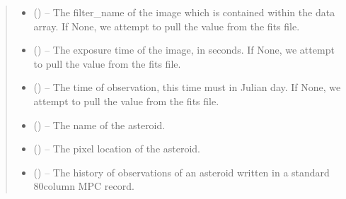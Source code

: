 \documentclass[letterpaper,11pt,english]{sphinxmanual}
\begin{document}
\begin{savenotes}
\begin{fulllineitems}
\begin{savenotes}
\begin{fulllineitems}
\begin{quote}
\begin{description}
\begin{itemize}
\item {} 
\sphinxAtStartPar
{} (\sphinxstyleliteralemphasis{\sphinxupquote{, }}) – The filter\_name of the image which is contained within the data
array. If None, we attempt to pull the value from the fits file.

\item {} 
\sphinxAtStartPar
{} (\sphinxstyleliteralemphasis{\sphinxupquote{, }}) – The exposure time of the image, in seconds.
If None, we attempt to pull the value from the fits file.

\item {} 
\sphinxAtStartPar
{} (\sphinxstyleliteralemphasis{\sphinxupquote{, }}) – The time of observation, this time must in Julian day.
If None, we attempt to pull the value from the fits file.

\item {} 
\sphinxAtStartPar
{} (\sphinxstyleliteralemphasis{\sphinxupquote{, }}) – The name of the asteroid.

\item {} 
\sphinxAtStartPar
{} (\sphinxstyleliteralemphasis{\sphinxupquote{, }}) – The pixel location of the asteroid.

\item {} 
\sphinxAtStartPar
{} (\sphinxstyleliteralemphasis{\sphinxupquote{, }}) – The history of observations of an asteroid written in a standard
80\sphinxhyphen{}column MPC record.

\end{itemize}

\end{description}\end{quote}


\end{fulllineitems}
\end{savenotes}
\end{fulllineitems}
\end{savenotes}
\end{document}

